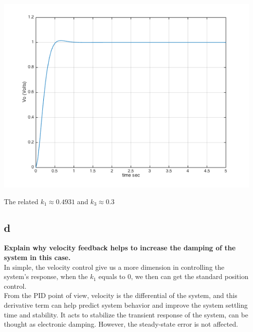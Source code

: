 \documentclass[11pt]{scrartcl}
\begin{document}
\begin{minipage}[t]{\linewidth}

{
\includegraphics[scale = 0.7]{fig_5.png}
}
\end{minipage}
\medskip

The related $k_1\approx0.4931$ and $k_3\approx0.3$

\subsection*{d}
\textbf{Explain why velocity feedback helps to increase the damping of the system in this case.}\\

In simple, the velocity control give us a more dimension in controlling the system's response, when the $k_1$ equals to 0, we then can get the standard position control.\\

From the PID point of view, velocity is the differential of the system, and this derivative term can help predict system behavior and improve the system settling time and stability.\cite{ref_1} It acts to stabilize the transient response of the system, can be thought as electronic damping. However, the steady-state error is not affected.\cite{ref_2}



 
\end{document}
